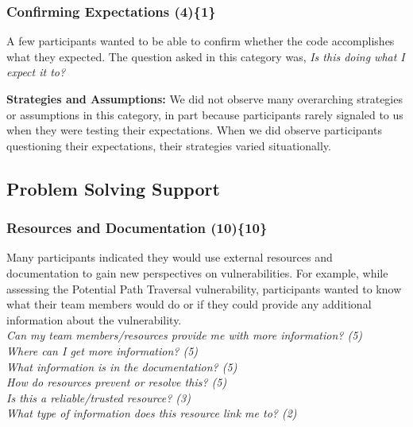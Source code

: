 \documentclass[10pt,journal,compsoc]{IEEEtran}
\begin{document}




\subsubsection{Confirming Expectations (4)\{1\}}

\label{ce}

A few participants wanted to be able to confirm whether the code accomplishes what they expected. 
The question asked in this category was, \textit{Is this doing what I expect it to?} 


\textbf{Strategies and Assumptions:}
We did not observe many overarching strategies or assumptions in this category, in part because participants rarely signaled to us when they were testing their expectations. 
When we did observe participants questioning their expectations, their strategies varied situationally.


\subsection{Problem Solving Support}
\label{sec:results-pss}
\subsubsection{Resources and Documentation (10)\{10\}}

\label{rd}
Many participants indicated they would use external resources and documentation to gain new perspectives on vulnerabilities.
For example, while assessing the Potential Path Traversal vulnerability, participants wanted to know what their team members would do or if they could provide any additional information about the vulnerability. 
\\

\noindent\emph{Can my team members/resources provide me with more information? (5)} \\
\emph{Where can I get more information? (5)} \\
\emph{What information is in the documentation? (5)} \\
\emph{How do resources prevent or resolve this? (5)} \\
\emph{Is this a reliable/trusted resource? (3)} \\
\emph{What type of information does this resource link me to? (2)}
\\
 
\end{document}
